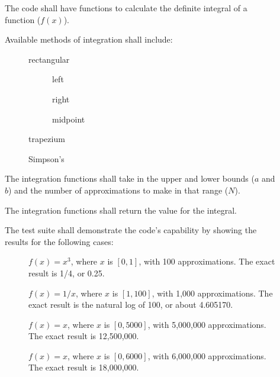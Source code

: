 \begin{description}
  \item[] The code shall have functions to calculate the definite integral of a function ($f(x)$).
  \item[] Available methods of integration shall include:
  \begin{description}
    \item[] rectangular
      \begin{description}
        \item[] left
        \item[] right
        \item[] midpoint
      \end{description}
    \item[] trapezium
    \item[] Simpson's 
  \end{description}
  \item[] The integration functions shall take in the upper and lower bounds ($a$ and $b$) and the number of 
approximations to make in that range ($N$). 
  \item[] The integration functions shall return the value for the integral.
  \item[] The test suite shall demonstrate the code's capability by showing the results for the following cases:
  \begin{description}
    \item[]
    $f(x) = x^3$, where $x$ is $[0,1]$, with 100 approximations. The exact result is 1/4, or 0.25.
    \item[]
    $f(x) = 1/x$, where $x$ is $[1,100]$, with 1,000 approximations. The exact result is the natural log of 100, or about 4.605170.
    \item[]
    $f(x) = x$, where $x$ is $[0,5000]$, with 5,000,000 approximations. The exact result is 12,500,000.
    \item[]
    $f(x) = x$, where $x$ is $[0,6000]$, with 6,000,000 approximations. The exact result is 18,000,000.
  \end{description}
\end{description}
